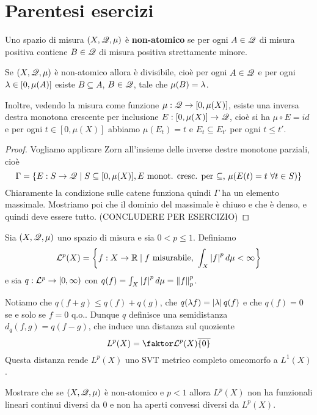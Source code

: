 \section{Parentesi esercizi}


\begin{definition}
    Uno spazio di misura $(X,\mathscr{Q},\mu)$ \`e \textbf{non-atomico} se per ogni $A\in\mathscr{Q}$ di misura positiva contiene $B\in\mathscr{Q}$ di misura positiva strettamente minore.
\end{definition}

\begin{exercise}[Sierpinski]
Se $(X,\mathscr{Q},\mu)$ \`e non-atomico allora \`e divisibile, cio\`e per ogni $A\in \mathscr{Q}$ e per ogni $\lambda\in [0,\mu(A)]$ esiste $B\subseteq A$, $B\in\mathscr{Q}$, tale che $\mu(B)=\lambda$.

Inoltre, vedendo la misura come funzione $\mu:\mathscr{Q}\to [0,\mu(X)]$, esiste una inversa destra monotona crescente per inclusione $E:[0,\mu(X)]\to \mathscr{Q}$, cio\`e si ha $\mu\circ E=id$ e per ogni $t\in [0,\mu(X)]$ abbiamo $\mu(E_t)=t$ e $E_t\subseteq E_{t'}$ per ogni $t\leq t'$.
\end{exercise}
\begin{proof}
Vogliamo applicare Zorn all'insieme delle inverse destre monotone parziali, cio\`e
\[\Gamma=\left\{{E:S\to \mathscr{Q}\mid S\subseteq [0,\mu(X)], E\text{ monot. cresc. per $\subseteq$, }\mu(E(t)=t\ \forall t\in S)}\right\}\]
Chiaramente la condizione sulle catene funziona quindi $\Gamma$ ha un elemento massimale. Mostriamo poi che il dominio del massimale \`e chiuso e che \`e denso, e quindi deve essere tutto. (CONCLUDERE PER ESERCIZIO)
\end{proof}

\begin{exercise}
Sia $(X,\mathscr{Q},\mu)$ uno spazio di misura e sia $0<p\leq1$. Definiamo
\[\mathcal{L}^p(X)=\left\{{f:X\to\mathbb{R}\mid f\text{ misurabile, }\int_X\left|{f}\right|^pd\mu<\infty}\right\}\]
e sia $q:\mathcal{L}^p\to [0,\infty)$ con $q(f)=\int_X\left|{f}\right|^pd\mu=\left\Vert{f}\right\Vert_p^p$.

Notiamo che $q(f+g)\leq q(f)+q(g)$, che $q(\lambda f)=\left|{\lambda}\right| q(f)$ e che $q(f)=0$ se e solo se $f=0$ q.o.. Dunque $q$ definisce una semidistanza $d_q(f,g)=q(f-g)$, che induce una distanza sul quoziente
\[L^p(X)=\quot{\Lc^p(X)}{\ol{\cpa0}}\]
Questa distanza rende $L^p(X)$ uno SVT metrico completo omeomorfo a $L^1(X)$.


Mostrare che se $(X,\mathscr{Q},\mu)$ \`e non-atomico e $p<1$ allora $L^p(X)$ non ha funzionali lineari continui diversi da $0$ e non ha aperti convessi diversi da $L^p(X)$.
\end{exercise}


